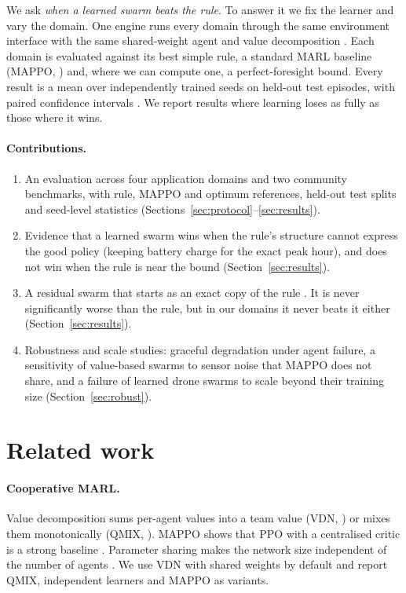 \documentclass[11pt]{article}
\begin{document}
We ask \emph{when a learned swarm beats the rule}. To answer it we fix the learner and vary the domain. One engine runs every domain through the same environment interface with the same shared-weight agent and value decomposition \citep{sunehag2018vdn}. Each domain is evaluated against its best simple rule, a standard MARL baseline (MAPPO, \citealp{yu2022mappo}) and, where we can compute one, a perfect-foresight bound. Every result is a mean over independently trained seeds on held-out test episodes, with paired confidence intervals \citep{henderson2018matters,agarwal2021rliable}. We report results where learning loses as fully as those where it wins.

\paragraph{Contributions.}
\begin{enumerate}
  \item An evaluation across four application domains and two community benchmarks, with rule, MAPPO and optimum references, held-out test splits and seed-level statistics (Sections~\ref{sec:protocol}--\ref{sec:results}).
  \item Evidence that a learned swarm wins when the rule's structure cannot express the good policy (keeping battery charge for the exact peak hour), and does not win when the rule is near the bound (Section~\ref{sec:results}).
  \item A residual swarm that starts as an exact copy of the rule \citep{silver2018residual,johannink2019residual}. It is never significantly worse than the rule, but in our domains it never beats it either (Section~\ref{sec:results}).
  \item Robustness and scale studies: graceful degradation under agent failure, a sensitivity of value-based swarms to sensor noise that MAPPO does not share, and a failure of learned drone swarms to scale beyond their training size (Section~\ref{sec:robust}).
\end{enumerate}

\section{Related work}

\paragraph{Cooperative MARL.} Value decomposition sums per-agent values into a team value (VDN, \citealp{sunehag2018vdn}) or mixes them monotonically (QMIX, \citealp{rashid2018qmix}). MAPPO shows that PPO with a centralised critic is a strong baseline \citep{yu2022mappo}. Parameter sharing makes the network size independent of the number of agents \citep{christianos2021selective}. We use VDN with shared weights by default and report QMIX, independent learners and MAPPO as variants.
\end{document}
